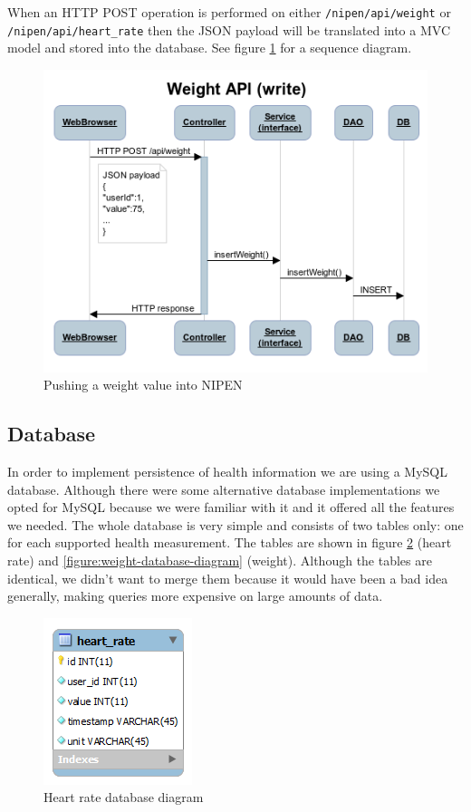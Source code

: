When an HTTP POST operation is performed on either \verb|/nipen/api/weight| or \newline
\verb|/nipen/api/heart_rate| then the JSON payload will be translated into a MVC model and
stored into the database. See figure \ref{figure:seqw} for a sequence diagram.

\begin{figure}[h]
\centering
\includegraphics[scale=0.8]{../Figures/seqw.png}
\caption{Pushing a weight value into NIPEN}
\label{figure:seqw}
\end{figure}


\subsection{Database}

In order to implement persistence of health information we are using a MySQL database.
Although there were some alternative database implementations we opted for MySQL
because we were familiar with it and it offered all the features we needed.
The whole database is very simple and consists of two tables only: one for each supported health measurement.
The tables are shown in figure \ref{figure:heart-rate-database-diagram} (heart rate)
and \ref{figure:weight-database-diagram} (weight).
Although the tables are identical, we didn't want to merge them because it would 
have been a bad idea generally, making queries more expensive on large amounts of data.

\begin{figure}[h]
\centering
\includegraphics[scale=1.0]{../Figures/heart-rate-database-diagram.png}
\caption{Heart rate database diagram}
\label{figure:heart-rate-database-diagram}
\end{figure}

